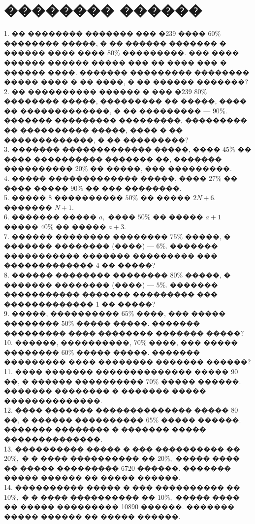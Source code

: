 \documentclass[12pt]{article}
\begin{document}
\section{�������� ������}
1. �� �������� ������� ��� �239 ���� $60\%$ �������� �����, � �� ������ ������� � ������ ���� ���� $80\%$ ���������. ��� ���� ������ ������ ����� ��� �� ���� ��� � ������ ����. ������� ��������� �������� ����� ���� � �� ����, � �� ������ �������?\\
2. �� ���������� ������ � ��� �239 $80\%$ �������� �����, ��������� �� �����, ���� �� �������������, � �� ��������� --- $90\%$. ������� ��������� ���������, ��������� �� ���������� �����, ���� � �� �������������, � �� ���������?\\
3. ������� ������������� �����, ���� $45\%$ �� ���� ���������� ������� ��, ������� ���������� $20\%$ �� �����, ��� ���������.\\
4. ����� ������������� �����, ���� $27\%$ �� ���� ����� $90\%$ �� ��� ��������.\\
5. ����� 8 ���������� $50\%$ �� ����� $2N+6.$ ������� $N+1.$\\
6. ������� ����� $a,$ ���� $50\%$ �� ����� $a+1$ ����� $40\%$ �� ����� $a+3.$\\
7. ������ �������� �������� $75\%$ �����, � ������� �������� (����) --- $6\%.$
������� ����������� ������� ��������� ��� ������������� 4 �� �����?\\
8. ������ �������� �������� $80\%$ �����, � ������� �������� (����) --- $5\%.$
������� ����������� ������� ��������� ��� ������������� 1 �� �����?\\
9. �����, ���������� $65\%$ ����, ��� ����� �������� $50\%$ ����� �����. ������� ��������� ���� �������� ������� �����?\\
10. ������, ����������, $70\%$ ����, ��� ����� �������� $60\%$ ����� �����. �������
��������� ���� �������� ������� ������?\\
11. ���� ������� �������������� ����� 90 ��, � ������ ���������� $70\%$ ����� ������. ������� �������� � ������� ����� ��������������.\\
12. ���� ������� �������������� ����� 80 ��, � ������ ���������� $65\%$ ����� ������. ������� �������� � ������� ����� ��������������.\\
13. ���������� ����� � ��� ���������� �� $20\%,$ � � ���� ���������� �� $20\%,$ ����� ���� �� ����� ��������� 6720 ������. ������� ����� ������ �� ����� ������.\\
14. ���������� ����� � ��� ���������� �� $10\%,$ � � ���� ���������� �� $10\%,$ ����� ���� �� ����� ��������� 10890 ������. ������� ����� ������ �� ����� ������.\\
\end{document}
